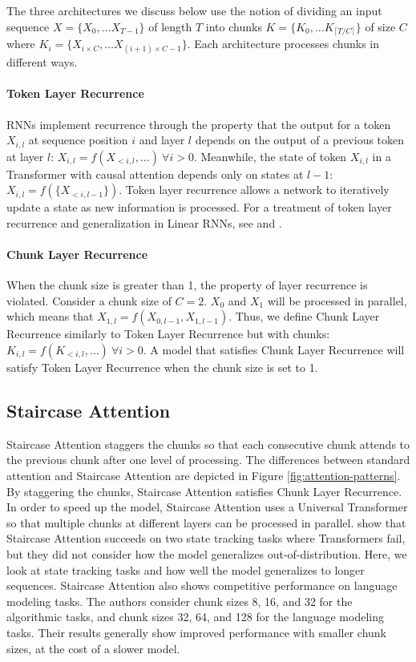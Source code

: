     The three architectures we discuss below use the notion of dividing an input sequence $X=\{X_0,\dots X_{T-1}\}$ of length $T$ into chunks $K=\{K_0,\dots K_{\lceil T/C\rceil}\}$ of size $C$ where $K_i=\{{X_{i\times C},\dots X_{(i+1)\times C - 1}}\}$. Each architecture processes chunks in different ways.
    
    \paragraph{Token Layer Recurrence} RNNs implement recurrence through the property that the output for a token $X_{i,l}$ at sequence position $i$ and layer $l$ depends on the output of a previous token at layer $l$: $X_{i,l}=f(X_{<i,l},\dots)\ \forall i>0$. Meanwhile, the state of token $X_{i,l}$ in a Transformer with causal attention depends only on states at $l-1$: $X_{i,l}=f(\{X_{<i,l-1}\})$. Token layer recurrence allows a network to iteratively update a state as new information is processed. For a treatment of token layer recurrence and generalization in Linear RNNs, see \citet{fan_advancing_2024} and \citet{merrill_illusion_2024}.
    
    \paragraph{Chunk Layer Recurrence} When the chunk size is greater than 1, the property of layer recurrence is violated. Consider a chunk size of $C=2$. $X_0$ and $X_1$ will be processed in parallel, which means that $X_{1,l}=f(X_{0,l-1},X_{1,l-1})$. Thus, we define Chunk Layer Recurrence similarly to Token Layer Recurrence but with chunks: $K_{i,l}=f(K_{<i,l},\dots)\ \forall i>0$. A model that satisfies Chunk Layer Recurrence will satisfy Token Layer Recurrence when the chunk size is set to 1.
    
    \subsection{Staircase Attention}
    Staircase Attention \citep{ju_staircase_2022} staggers the chunks so that each consecutive chunk attends to the previous chunk after one level of processing. The differences between standard attention and Staircase Attention are depicted in Figure \ref{fig:attention-patterns}. By staggering the chunks, Staircase Attention satisfies Chunk Layer Recurrence. In order to speed up the model, Staircase Attention uses a Universal Transformer \citep{dehghani_universal_2018} so that multiple chunks at different layers can be processed in parallel. \citet{ju_staircase_2022} show that Staircase Attention succeeds on two state tracking tasks where Transformers fail, but they did not consider how the model generalizes out-of-distribution. Here, we look at state tracking tasks and how well the model generalizes to longer sequences. Staircase Attention also shows competitive performance on language modeling tasks. The authors consider chunk sizes 8, 16, and 32 for the algorithmic tasks, and chunk sizes 32, 64, and 128 for the language modeling tasks. Their results generally show improved performance with smaller chunk sizes, at the cost of a slower model.
    

